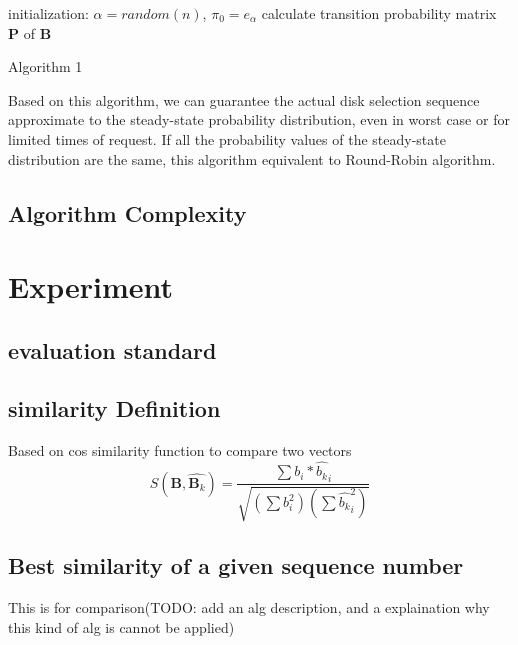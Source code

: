 \documentclass[11pt,a4paper]{article}
\begin{document}
\begin{algorithm}[H]
  initialization: $\alpha=random(n)$, $\pi_{0} = e_{\alpha}$\;
  calculate transition probability matrix $\mathbf{P}$ of $\mathbf{B}$\;
  \For{$k$th request from client, $k >= 1$}{
    $\pi_{k} = \pi_{k-1} \mathbf{P}$\;
    select disk $\gamma_{k}$ based on the prabability $\pi_{k}$(TODO: describe details)\;
    adjust $\pi_{k} = (1-\eta)\pi_{k} + \eta*e_{\gamma_{k}}$\;
  }
\caption{Algorithm 1}
\label{alg:final}
\end{algorithm}

Based on this algorithm, we can guarantee the actual disk selection sequence 
approximate to the steady-state probability distribution, even in worst case or for limited times of request. If all the probability 
values of the steady-state distribution are the same, this algorithm 
equivalent to Round-Robin algorithm.

\subsection{\textbf{Algorithm Complexity}}

\section{\textbf\normalsize{Experiment}}
\subsection{\textbf evaluation standard}
\subsection{\textbf {similarity Definition}}
Based on cos similarity function to compare two vectors
\begin{equation}
S(\mathbf{B}, \hat{\mathbf{B}_k}) = \frac{\sum{b_{i} * \hat{b_k}_{i}}} {\sqrt{(\sum{b_{i}^2})(\sum{\hat{b_k}_i^2})}}
\end{equation}

\subsection{\textbf {Best similarity of a given sequence number}}
This is for comparison(TODO: add an alg description, and a explaination why this kind of alg is cannot be applied)
\end{document}
